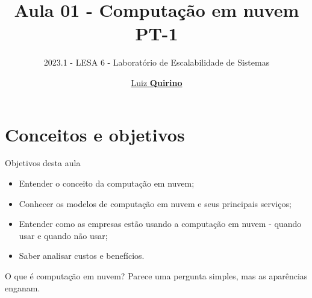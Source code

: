 \documentclass{beamer}
\title{Aula 01 - Computação em nuvem PT-1}
\subtitle{2023.1 - LESA 6 -  Laboratório de Escalabilidade de Sistemas}
\author{\href{mailto:luiz.quirino@ifsp.edu.br}{Luiz \textbf{Quirino}}}
\begin{document}
\maketitle
{}

\section{Conceitos e objetivos}

\begin{frame}[fragile]{Objetivos desta aula}\justifying
      \begin{itemize}
            \item Entender o conceito da computação em nuvem;
            \item Conhecer os modelos de computação em nuvem e seus principais serviços;
            \item Entender como as empresas estão usando a computação em nuvem - quando usar e quando não usar;
            \item Saber analisar custos e benefícios.
      \end{itemize}
\end{frame}

\begin{frame}[fragile]{O que é computação em nuvem?}\justifying
      Parece uma pergunta simples, mas as aparências enganam.
\end{frame}
\end{document}
